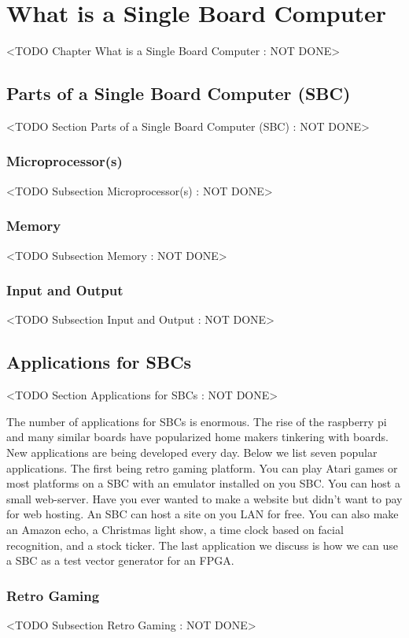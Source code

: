 \chapter{What is a Single Board Computer}
	<TODO Chapter What is a Single Board Computer : NOT DONE>

\section{Parts of a Single Board Computer (SBC)}
	<TODO Section Parts of a Single Board Computer (SBC) : NOT DONE>

\subsection{Microprocessor(s)}
	<TODO Subsection Microprocessor(s) : NOT DONE>

\subsection{Memory}
	<TODO Subsection Memory : NOT DONE>

\subsection{Input and Output}
	<TODO Subsection Input and Output : NOT DONE>

\section{Applications for SBCs}
	<TODO Section Applications for SBCs : NOT DONE>
	
The number of applications for \ac{SBC}s is enormous. The rise of the raspberry pi and many similar boards have popularized home makers tinkering with boards. New applications are being developed every day.  Below we list seven popular applications. The first being retro gaming platform. You can play Atari games or most platforms on a \ac{SBC} with an emulator installed on you \ac{SBC}. You can host a small web-server. Have you ever wanted to make a website but didn't want to pay for web hosting. An \ac{SBC} can host a site on you \ac{LAN} for free. You can also make an Amazon echo, a Christmas light show, a time clock based on facial recognition, and a stock ticker. The last application we discuss is how we can use a \ac{SBC} as a test vector generator for an \ac{FPGA}. 

\subsection{Retro Gaming}
	<TODO Subsection Retro Gaming : NOT DONE>
	

